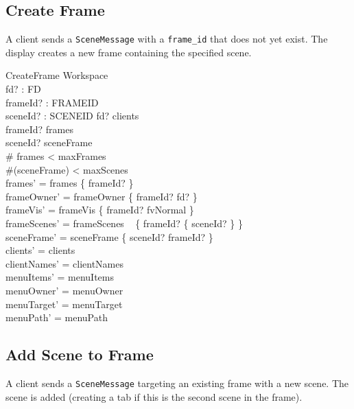 \documentclass[a4paper,10pt,fleqn]{article}
\begin{document}
\subsection{Create Frame}

A client sends a \texttt{SceneMessage} with a \texttt{frame\_id} that
does not yet exist.  The display creates a new frame containing the
specified scene.

\begin{schema}{CreateFrame}
  \Delta Workspace \\
  fd? : FD \\
  frameId? : FRAMEID \\
  sceneId? : SCENEID
  \where
  fd? \in clients \\
  frameId? \notin frames \\
  sceneId? \notin \dom sceneFrame \\
  \# frames < maxFrames \\
  \#(\dom sceneFrame) < maxScenes \\
  frames' = frames \cup \{ frameId? \} \\
  frameOwner' = frameOwner \cup \{ frameId? \mapsto fd? \} \\
  frameVis' = frameVis \cup \{ frameId? \mapsto fvNormal \} \\
  frameScenes' = frameScenes \cup
  \quad~ \{ frameId? \mapsto \{ sceneId? \} \} \\
  sceneFrame' = sceneFrame \cup \{ sceneId? \mapsto frameId? \} \\
  clients' = clients \\
  clientNames' = clientNames \\
  menuItems' = menuItems \\
  menuOwner' = menuOwner \\
  menuTarget' = menuTarget \\
  menuPath' = menuPath
\end{schema}

\subsection{Add Scene to Frame}

A client sends a \texttt{SceneMessage} targeting an existing frame
with a new scene.  The scene is added (creating a tab if this is
the second scene in the frame).
\end{document}
